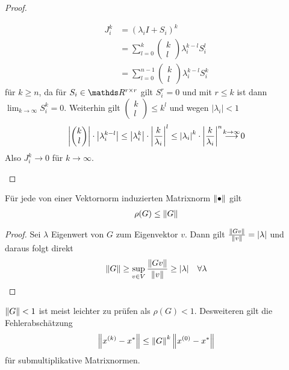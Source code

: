 \begin{Satze}[Konvergenzkriterien]
\begin{proof}
\begin{description}
\begin{align*}
  J_i^k &= (\lambda_i I+S_i)^k \\
        &= \sum_{l=0}^{k}\begin{pmatrix}k\\l\end{pmatrix}
  \lambda_i^{k-l} S_i^l\\
        &=\sum_{l=0}^{n-1} \begin{pmatrix}k\\l\end{pmatrix}
  \lambda_i^{k-l} S_i^{k}
\end{align*}
für $k\geq n$, da für $S_i\in\R^{r\times r}$ gilt $S_i^r=0$ 
und mit $r\leq k$ ist dann $\lim_{k\to\infty}S_i^k=0$.
Weiterhin gilt $\begin{pmatrix}k\\l\end{pmatrix}\leq k^l$ 
und wegen $|\lambda_i|<1$
\begin{gather*}
  \left| \begin{pmatrix}k\\l\end{pmatrix}\right|
  \cdot\left|\lambda_i^{k-l}\right|
  \leq \left|\lambda_i^{k}\right| 
  \cdot \left|\frac{k}{\lambda_i}\right|^l
  \leq \left|\lambda_i\right|^k
  \cdot \left|\frac{k}{\lambda_i}\right|^n
\overset{\mathclap{k\rightarrow \infty}}{\longrightarrow} 0
\end{gather*}
Also $J_i^k\longrightarrow 0$ für $k\longrightarrow \infty$.
  \end{description}
\end{proof}
\end{Satze}


\begin{Leme}
  Für jede von einer Vektornorm induzierten Matrixnorm 
$\left\| \bullet \right\|$ gilt
\begin{gather}
  \rho(G) \leq \left\| G \right\|
\label{IX.2.9}
\end{gather}
\begin{proof}
  Sei $\lambda$ Eigenwert von $G$ zum Eigenvektor $v$.
Dann gilt $\frac{\left\| Gv \right\|}{\left\| v \right\|} = |\lambda|$
und daraus folgt direkt
\begin{gather*}
  \left\| G \right\| \geq \sup_{v\in V}\frac{\left\| Gv \right\|}{\left\| v \right\|}\geq |\lambda|
  \quad \forall \lambda
\end{gather*}
\end{proof}
\end{Leme}

$\left\| G \right\|<1$ ist meist leichter zu prüfen als $\rho(G)<1$.
Desweiteren gilt die Fehlerabschätzung
\begin{gather}
   \left\| x^{(k)}-x^{*} \right\|\leq \left\| G \right\|^k\left\| x^{(0)}-x^{*} \right\|
   \label{IX.2.10}
\end{gather}
für submultiplikative Matrixnormen.



